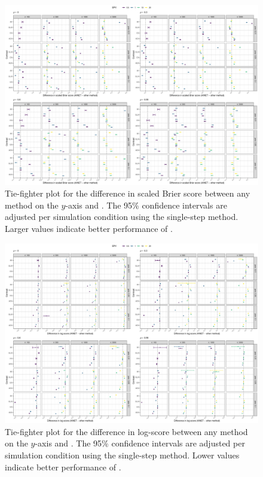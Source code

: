 \begin{landscape}
\begin{figure}[!ht]
\center
\includegraphics[width=0.9\linewidth]{figures-appendix/tie-fighter_scaledBrier.pdf}
\caption{Tie-fighter plot for the difference in scaled Brier score between any
  method on the $y$-axis and \ainet{}. The 95\% confidence intervals are adjusted
  per simulation condition using the single-step method. Larger
  values indicate better performance of \ainet{}. } \label{fig:tiesbrier}
\end{figure}
\end{landscape}

\begin{landscape}
\begin{figure}[!ht]
\center
\includegraphics[width=0.9\linewidth]{figures-appendix/tie-fighter_nll.pdf}
\caption{Tie-fighter plot for the difference in log-score between any method on
  the $y$-axis and \ainet{}. The 95\% confidence intervals are adjusted per
  simulation condition using the single-step method. Lower values indicate
  better performance of \ainet{}. } \label{fig:tienll}
\end{figure}
\end{landscape}

